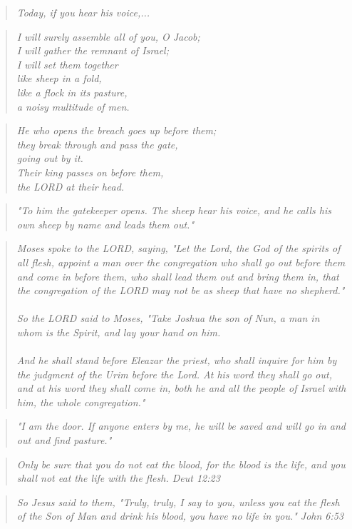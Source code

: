 \documentclass[10pt,oneside,footinclude=true,headinclude=true]{scrbook} %
\newcommand\quot[1]{
	\begin{quote}\textit{\small#1}\end{quote}
}
\begin{document}
\quot{Today, if you hear his voice,...}

\quot{I will surely assemble all of you, O Jacob;\\
\hspace*{5mm}I will gather the remnant of Israel;\\
I will set them together\\
\hspace*{5mm}like sheep in a fold,\\
like a flock in its pasture,\\
\hspace*{5mm}a noisy multitude of men.}

\quot{He who opens the breach goes up before them;\\
\hspace*{5mm}they break through and pass the gate,\\
\hspace*{5mm}going out by it.\\
Their king passes on before them,\\
\hspace*{5mm}the LORD at their head.}

\quot{"To him the gatekeeper opens. The sheep hear his voice, and he calls his own sheep by name and leads them out."}

\quot{Moses spoke to the LORD, saying, "Let the Lord, the God of the spirits of all flesh, appoint a man over the congregation who shall go out before them and come in before them, who shall lead them out and bring them in, that the congregation of the LORD may not be as sheep that have no shepherd."\\
\\
So the LORD said to Moses, "Take Joshua the son of Nun, a man in whom is the Spirit, and lay your hand on him.\\
\\
And he shall stand before Eleazar the priest, who shall inquire for him by the judgment of the Urim before the Lord. At his word they shall go out, and at his word they shall come in, both he and all the people of Israel with him, the whole congregation."}

\quot{"I am the door. If anyone enters by me, he will be saved and will go in and out and find pasture."}

\quot{Only be sure that you do not eat the blood, for the blood is the life, and you shall not eat the life with the flesh. Deut 12:23}

\quot{So Jesus said to them, "Truly, truly, I say to you, unless you eat the flesh of the Son of Man and drink his blood, you have no life in you." John 6:53}
\end{document}

